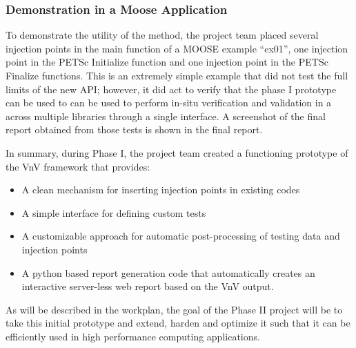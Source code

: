 \subsubsection{ Demonstration in a Moose Application } 
To demonstrate the utility of the method, the project team placed several injection points 
in the main function of a MOOSE example ``ex01'', one injection point in the PETSc Initialize function and 
one injection point in the PETSc Finalize functions. This is an extremely simple example that 
did not test the full limits of the new API; however, it did act to verify that the phase I prototype 
can be used to can be used to perform in-situ verification and validation in a across multiple libraries 
through a single interface. A screenshot of the final \VV report obtained from those tests is shown in the 
final report. 

In summary, during Phase I, the project team created a functioning prototype of the VnV framework that provides:
\begin{itemize}
 \item A clean mechanism for inserting injection points in existing codes
 \item A simple interface for defining custom tests 
 \item A customizable approach for automatic post-processing of testing data and injection points
 \item A python based report generation code that automatically creates an interactive server-less web report based on the VnV output.
\end{itemize}

As will be described in the workplan, the goal of the Phase II project will be to take this initial prototype and extend, harden and 
optimize it such that it can be efficiently used in high performance computing applications. 





























